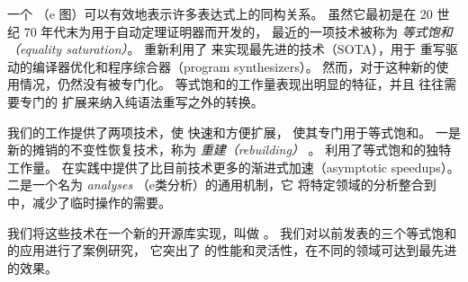 一个 \egraph （e 图）可以有效地表示许多表达式上的同构关系。
虽然它最初是在 20 世纪 70 年代末为用于自动定理证明器而开发的，
  最近的一项技术被称为 \textit{等式饱和（equality saturation）}。
  重新利用了 \egraphs 来实现最先进的技术（SOTA），用于
  重写驱动的编译器优化和程序综合器（program synthesizers）。
然而，对于这种新的使用情况，\egraphs 仍然没有被专门化。
等式饱和的工作量表现出明显的特征，并且
  往往需要专门的 \egraph 扩展来纳入纯语法重写之外的转换。

我们的工作提供了两项技术，使 \egraphs 快速和方便扩展，
  使其专门用于等式饱和。
一是新的摊销的不变性恢复技术，称为 \textit{重建（rebuilding）} 。
  利用了等式饱和的独特工作量。
  在实践中提供了比目前技术更多的渐进式加速（asymptotic speedups）。
二是一个名为 \textit{\eclass analyses} （e类分析）的通用机制，它
  将特定领域的分析整合到 \egraph 中，减少了临时操作的需要。         

我们将这些技术在一个新的开源库实现，叫做 \egg。
我们对以前发表的三个等式饱和的应用进行了案例研究，
  它突出了 \egg 的性能和灵活性，在不同的领域可达到最先进的效果。




